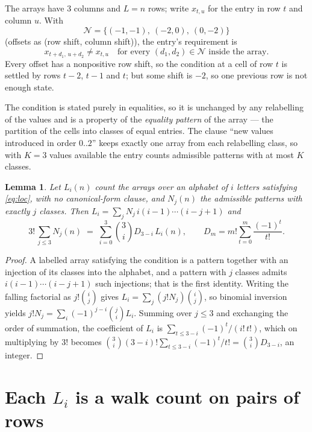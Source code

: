 \documentclass[11pt,a4paper]{article}
\theoremstyle{plain}
\newtheorem{lemma}[theorem]{Lemma}
\theoremstyle{definition}
\begin{document}
The arrays have $3$ columns and $L=n$ rows; write $x_{t,u}$ for the entry in
row $t$ and column $u$. With
\[
\mathcal N=\{(-1,-1),\ (-2,0),\ (0,-2)\}
\]
(offsets as (row shift, column shift)), the entry's requirement is
\begin{equation}\label{eq:loc}
x_{t+d_1,\,u+d_2}\ne x_{t,u}\quad\text{for every }(d_1,d_2)\in\mathcal N\text{ inside the array}.
\end{equation}
Every offset has a nonpositive row shift, so the condition at a cell of row $t$ is
settled by rows $t-2$, $t-1$ and $t$; but some shift is $-2$, so one previous row is not
enough state.

The condition is stated purely in equalities, so it is unchanged by any relabelling of the
values and is a property of the \emph{equality pattern} of the array --- the partition of
the cells into classes of equal entries. The clause ``new values introduced in order
$0..2$'' keeps exactly one array from each relabelling class, so with $K=3$ values
available the entry counts admissible patterns with at most $K$ classes.

\begin{lemma}\label{lem:inv}
Let $L_i(n)$ count the arrays over an alphabet of $i$ letters satisfying \eqref{eq:loc},
with no canonical-form clause, and $N_j(n)$ the admissible patterns with exactly $j$ classes.
Then $L_i=\sum_j N_j\,i(i-1)\cdots(i-j+1)$ and
\[
3!\,\sum_{j\le 3}N_j(n)\;=\;\sum_{i=0}^{3}\binom{3}{i}D_{3-i}\,L_i(n),
\qquad D_m=m!\sum_{t=0}^{m}\frac{(-1)^t}{t!} .
\]
\end{lemma}

\begin{proof}
A labelled array satisfying the condition is a pattern together with an injection of its
classes into the alphabet, and a pattern with $j$ classes admits $i(i-1)\cdots(i-j+1)$ such
injections; that is the first identity. Writing the falling factorial as $j!\binom{i}{j}$
gives $L_i=\sum_j(j!N_j)\binom{i}{j}$, so binomial inversion yields
$j!N_j=\sum_i(-1)^{j-i}\binom{j}{i}L_i$. Summing over $j\le3$ and exchanging the
order of summation, the coefficient of $L_i$ is $\sum_{t\le3-i}(-1)^t/(i!\,t!)$, which on
multiplying by $3!$ becomes
$\binom{3}{i}(3-i)!\sum_{t\le3-i}(-1)^t/t!=\binom{3}{i}D_{3-i}$, an
integer.
\end{proof}

\section{Each $L_i$ is a walk count on pairs of rows}
\end{document}
